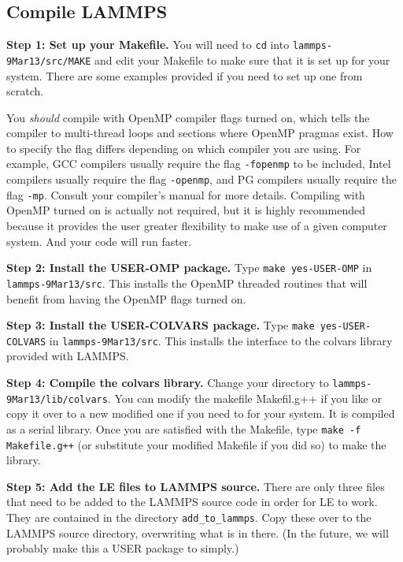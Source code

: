 \documentclass[10pt]{article}
\begin{document}
\subsection{Compile LAMMPS}\label{sec:LAMMPS}

\textbf{Step 1: Set up your Makefile.}
You will need to \texttt{cd} into \texttt{lammps-9Mar13/src/MAKE} and edit your Makefile to 
make sure that it is set up for your system. There are some examples provided if you need
to set up one from scratch.

You {\em should} compile with OpenMP compiler flags turned on, which tells the compiler
to multi-thread loops and sections where OpenMP pragmas exist. How to specify the flag differs 
depending on which compiler you are using. For example, GCC compilers usually require
the flag \texttt{-fopenmp} to be included, Intel compilers usually require
the flag \texttt{-openmp}, and PG compilers usually require the flag \texttt{-mp}.
Consult your compiler's manual for more details. 
Compiling with OpenMP turned on is actually not required, but it is highly recommended because
it provides the user greater flexibility to make use of a given computer system. And your code will
run faster.

\textbf{Step 2: Install the USER-OMP package.}
Type \texttt{make yes-USER-OMP} in \texttt{lammps-9Mar13/src}. This installs the OpenMP
threaded routines that will benefit from having the OpenMP flags turned on.

\textbf{Step 3: Install the USER-COLVARS package.}
Type \texttt{make yes-USER-COLVARS} in \texttt{lammps-9Mar13/src}. This installs the
interface to the colvars library provided with LAMMPS.

\textbf{Step 4: Compile the colvars library.}
Change your directory to \texttt{lammps-9Mar13/lib/colvars}. You can modify the
makefile Makefil.g++ if you like or copy it over to a new modified one if you 
need to for your system. It is compiled as a serial library. Once you are satisfied
with the Makefile, type \texttt{make -f Makefile.g++} (or substitute your modified Makefile if
you did so) to make the library.

\textbf{Step 5: Add the LE files to LAMMPS source.}
There are only three files that need to be added to the LAMMPS source code in order
for LE to work. They are contained in the directory \texttt{add\_to\_lammps}. Copy these
over to the LAMMPS source directory, overwriting what is in there. (In the future, we
will probably make this a USER package to simply.)
\end{document}

